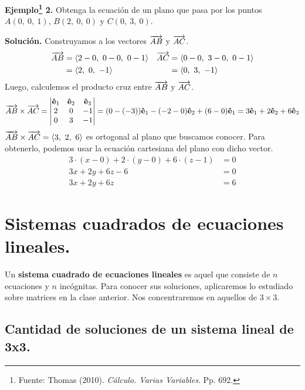 \documentclass[12pt]{article}
\begin{document}
\textbf{Ejemplo\footnote{Fuente: Thomas (2010). \textit{Cálculo. Varias Variables}. Pp. 692.} 2.} Obtenga la ecuación de un plano que pasa por los puntos $A(0, \ 0, \ 1)$, $B(2, \ 0, \ 0)$ y $C(0, \ 3, \ 0)$.

\textbf{Solución.} Construyamos a los vectores $\overrightarrow{AB}$ y $\overrightarrow{AC}$.
\begin{align*}
  \overrightarrow{AB} &= \langle 2 - 0, \ 0 - 0, \ 0 - 1 \rangle & \overrightarrow{AC} &= \langle 0 - 0, \ 3 - 0, \ 0 - 1 \rangle \\
               &= \langle 2, \ 0, \ -1 \rangle            &              &= \langle 0, \ 3, \ -1 \rangle
\end{align*}
Luego, calculemos el producto cruz entre $\overrightarrow{AB}$ y $\overrightarrow{AC}$.
\begin{align*}
\overrightarrow{AB} \times \overrightarrow{AC} =
\begin{vmatrix}
\mathbf{\hat{e}}_{1} & \mathbf{\hat{e}}_{2} & \mathbf{\hat{e}}_{3} \\
2 & 0 & -1 \\
0 & 3 & -1
\end{vmatrix} =
(0 - (-3)) \mathbf{\hat{e}}_{1} - (-2 - 0) \mathbf{\hat{e}}_{2} + (6 - 0) \mathbf{\hat{e}}_{1} =
3 \mathbf{\hat{e}}_{1} + 2 \mathbf{\hat{e}}_{2} + 6 \mathbf{\hat{e}}_{3}
\end{align*}
$\overrightarrow{AB} \times \overrightarrow{AC} = \langle 3, \ 2, \ 6 \rangle$ es ortogonal al plano que buscamos conocer. Para obtenerlo, podemos usar la ecuación cartesiana del plano con dicho vector.
\begin{align*}
3 \cdot (x - 0) + 2 \cdot (y - 0) + 6 \cdot (z - 1) &= 0 \\
3x + 2y + 6z - 6 &= 0 \\
3x + 2y + 6z &= 6
\end{align*}


\section{Sistemas cuadrados de ecuaciones lineales.}

Un \textbf{sistema cuadrado de ecuaciones lineales} es aquel que consiste de $n$ ecuaciones y $n$ incógnitas. Para conocer sus soluciones, aplicaremos lo estudiado sobre matrices en la clase anterior. Nos concentraremos en aquellos de $3 \times 3$.

\subsection{Cantidad de soluciones de un sistema lineal de 3x3.}
\end{document}
